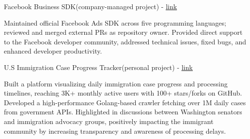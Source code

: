 


\begin{cventries}


	\compactcventry
	{Facebook Business SDK(company-managed project) - \underline{\href{https://github.com/facebook/facebook-python-business-sdk}{link}}}
	{} %
	{
		\begin{cvitems}
			\item{Maintained official Facebook Ads SDK across five programming languages; reviewed and merged external PRs as repository owner. Provided direct support to the Facebook developer community, addressed technical issues, fixed bugs, and enhanced developer productivity.}
		\end{cvitems}
	}

	\compactcventry
	{U.S Immigration Case Progress Tracker(personal project) - \underline{\href{https://github.com/vicdus/uscis-case-statistics/}{link}}}
	{} %
	{
		\begin{cvitems}
			\item{Built a platform visualizing daily immigration case progress and processing timelines, reaching 3K+ monthly active users with 100+ stars/forks on GitHub. Developed a high-performance Golang-based crawler fetching over 1M daily cases from government APIs. Highlighted in discussions between Washington senators and immigration advocacy groups, positively impacting the immigrant community by increasing transparency and awareness of processing delays.}
		\end{cvitems}
	}






\end{cventries}